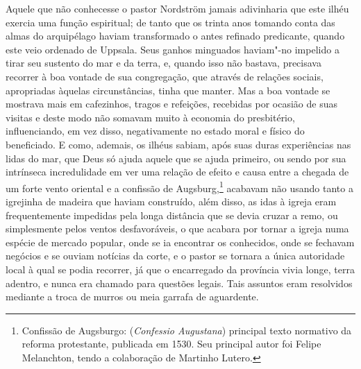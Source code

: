 Aquele que não conhecesse o pastor Nordström jamais adivinharia que este
ilhéu exercia uma função espiritual; de tanto que os trinta anos tomando conta das
almas do arquipélago haviam transformado o antes refinado predicante,
quando este veio ordenado de Uppsala. Seus ganhos minguados haviam"-no impelido a
tirar seu sustento do mar e da terra, e, quando isso não bastava, precisava
recorrer à boa vontade de sua congregação, que através de relações sociais,
apropriadas àquelas circunstâncias, tinha que manter. Mas a boa vontade se
mostrava mais em cafezinhos, tragos e refeições, recebidas por ocasião de suas
visitas e deste modo não somavam muito à economia do presbitério, influenciando,
em vez disso, negativamente no estado moral e físico do beneficiado. E como,
ademais, os ilhéus sabiam, após suas duras experiências nas lidas do mar, que
Deus só ajuda aquele que se ajuda primeiro, ou sendo por sua intrínseca
incredulidade em ver uma relação de efeito e causa entre a chegada de um forte
vento oriental e a confissão de Augsburg,\footnote{ Confissão de Augsburgo:
(\textit{Confessio Augustana}) principal texto normativo da 
reforma protestante, publicada em 1530. Seu principal autor 
foi Felipe Melanchton, tendo a colaboração de Martinho Lutero.}
acabavam não usando tanto a igrejinha de madeira que haviam 
construído, além disso, as idas à igreja eram 
frequentemente impedidas pela longa distância 
que se devia cruzar a remo, ou simplesmente pelos
ventos desfavoráveis, o que acabara por tornar a igreja numa espécie de mercado
popular, onde se ia encontrar os conhecidos, onde se fechavam negócios e se
ouviam notícias da corte, e o pastor se tornara a única autoridade local à qual
se podia recorrer, já que o encarregado da província vivia longe, terra adentro,
e nunca era chamado para questões legais. Tais assuntos eram resolvidos mediante
a troca de murros ou meia garrafa de aguardente.

